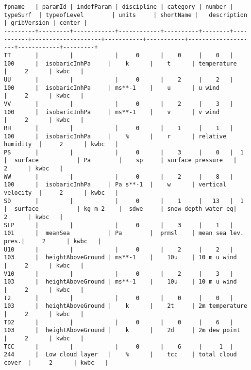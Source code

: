 \documentclass{egu}                  %
\begin{document}
\begin{landscape} 
\begin{scriptsize}\begin{verbatim}
fpname   | paramId | indofParam | discipline | category | number | typeSurf  | typeofLevel        | units     | shortName |   description      | gribVersion | center |
---------+---------+------------+------------+----------+--------+-----------+--------------------+-----------+-----------+--------------------+------------+---------+
TT       |         |            |     0      |    0     |    0   |  100      |  isobaricInhPa     |    k      |    t      | temperature        |     2      | kwbc   |
UU       |         |            |     0      |    2     |    2   |  100      |  isobaricInhPa     | ms**-1    |    u      | u wind             |     2      | kwbc   |
VV       |         |            |     0      |    2     |    3   |  100      |  isobaricInhPa     | ms**-1    |    v      | v wind             |     2      | kwbc   |
RH       |         |            |     0      |    1     |    1   |  100      |  isobaricInhPa     |    %      |    r      | relative humidity  |     2      | kwbc   |
PS       |         |            |     0      |    3     |    0   |  1        |  surface           | Pa        |    sp     | surface pressure   |     2      | kwbc   |
WW       |         |            |     0      |    2     |    8   |  100      |  isobaricInhPa     | Pa s**-1  |    w      | vertical velocity  |     2      | kwbc   |
SD       |         |            |     0      |    1     |   13   |  1        |  surface           | kg m-2    |  sdwe     | snow depth water eq|     2      | kwbc   |
SLP      |         |            |     0      |    3     |    1   |  101      |  meanSea           | Pa        |  prmsl    | mean sea lev. pres.|     2      | kwbc   |
U10      |         |            |     0      |    2     |    2   |  103      |  heightAboveGround | ms**-1    |    10u    | 10 m u wind        |     2      | kwbc   |
V10      |         |            |     0      |    2     |    3   |  103      |  heightAboveGround | ms**-1    |    10u    | 10 m u wind        |     2      | kwbc   |
T2       |         |            |     0      |    0     |    0   |  103      |  heightAboveGround |    k      |    2t     | 2m temperature     |     2      | kwbc   | 
TD2      |         |            |     0      |    0     |    6   |  103      |  heightAboveGround |    k      |    2d     | 2m dew point       |     2      | kwbc   |
TCC      |         |            |     0      |    6     |     1  |  244      |  Low cloud layer   |    %      |    tcc    | total cloud cover  |     2      | kwbc   |

\end{verbatim}
\end{scriptsize}
\end{landscape}
\end{document}
